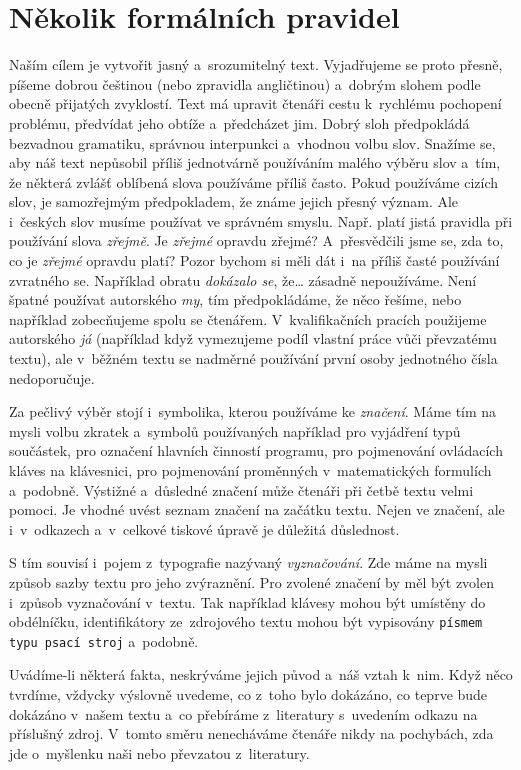 \chapter{Několik formálních pravidel}
Naším cílem je vytvořit jasný a~srozumitelný text. Vyjadřujeme se proto přesně, píšeme dobrou češtinou (nebo zpravidla angličtinou) a~dobrým slohem podle obecně přijatých zvyklostí. Text má upravit čtenáři cestu k~rychlému pochopení problému, předvídat jeho obtíže a~předcházet jim. Dobrý sloh předpokládá bezvadnou gramatiku, správnou interpunkci a~vhodnou volbu slov. Snažíme se, aby náš text nepůsobil příliš jednotvárně používáním malého výběru slov a~tím, že některá zvlášť oblíbená slova používáme příliš často. Pokud používáme cizích slov, je samozřejmým předpokladem, že známe jejich přesný význam. Ale i~českých slov musíme používat ve správném smyslu. Např. platí jistá pravidla při používání slova {\it zřejmě}. Je {\it zřejmé} opravdu zřejmé? A~přesvědčili jsme se, zda to, co je {\it zřejmé} opravdu platí? Pozor bychom si měli dát i~na příliš časté používání zvratného se. Například obratu {\it dokázalo se}, že\ldots{} zásadně nepoužíváme. Není špatné používat autorského {\it my}, tím předpokládáme, že něco řešíme, nebo například zobecňujeme spolu se čtenářem. V~kvalifikačních pracích použijeme autorského {\it já} (například když vymezujeme podíl vlastní práce vůči převzatému textu), ale v~běžném textu se nadměrné používání první osoby jednotného čísla nedoporučuje.

Za pečlivý výběr stojí i~symbolika, kterou používáme ke {\it značení}. Máme tím na mysli volbu zkratek a~symbolů používaných například pro vyjádření typů součástek, pro označení hlavních činností programu, pro pojmenování ovládacích kláves na klávesnici, pro pojmenování proměnných v~matematických formulích a~podobně. Výstižné a~důsledné značení může čtenáři při četbě textu velmi pomoci. Je vhodné uvést seznam značení na začátku textu. Nejen ve značení, ale i~v~odkazech a~v~celkové tiskové úpravě je důležitá důslednost.

S tím souvisí i~pojem z~typografie nazývaný {\it vyznačování}. Zde máme na mysli způsob sazby textu pro jeho zvýraznění. Pro zvolené značení by měl být zvolen i~způsob vyznačování v~textu. Tak například klávesy mohou být umístěny do obdélníčku, identifikátory ze~zdrojového textu mohou být vypisovány {\tt písmem typu psací stroj} a~podobně.

Uvádíme-li některá fakta, neskrýváme jejich původ a~náš vztah k~nim. Když něco tvrdíme, vždycky výslovně uvedeme, co z~toho bylo dokázáno, co teprve bude dokázáno v~našem textu a~co přebíráme z~literatury s~uvedením odkazu na příslušný zdroj. V~tomto směru nenecháváme čtenáře nikdy na pochybách, zda jde o~myšlenku naši nebo převzatou z~literatury.

